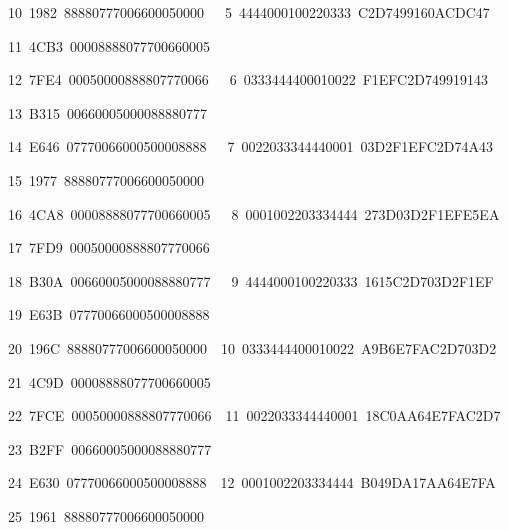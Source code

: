 \documentclass[a4paper,oneside,english]{amsart}
\numberwithin{equation}{section}
\numberwithin{figure}{section}
\newenvironment{lyxcode}
{\par\begin{list}{}{
\setlength{\rightmargin}{\leftmargin}
\setlength{\listparindent}{0pt}\raggedright
\setlength{\itemsep}{0pt}
\setlength{\parsep}{0pt}
\normalfont\ttfamily}\item[]}
{\end{list}}
\begin{document}
\begin{table}
\begin{lyxcode}
{\footnotesize{}~10~1982~88880777006600050000~~~5~4444000100220333~C2D7499160ACDC47}{\footnotesize \par}

{\footnotesize{}~11~4CB3~00008888077700660005}{\footnotesize \par}

{\footnotesize{}~12~7FE4~00050000888807770066~~~6~0333444400010022~F1EFC2D749919143}{\footnotesize \par}

{\footnotesize{}~13~B315~00660005000088880777}{\footnotesize \par}

{\footnotesize{}~14~E646~07770066000500008888~~~7~0022033344440001~03D2F1EFC2D74A43}{\footnotesize \par}

{\footnotesize{}~15~1977~88880777006600050000}{\footnotesize \par}

{\footnotesize{}~16~4CA8~00008888077700660005~~~8~0001002203334444~273D03D2F1EFE5EA}{\footnotesize \par}

{\footnotesize{}~17~7FD9~00050000888807770066}{\footnotesize \par}

{\footnotesize{}~18~B30A~00660005000088880777~~~9~4444000100220333~1615C2D703D2F1EF}{\footnotesize \par}

{\footnotesize{}~19~E63B~07770066000500008888}{\footnotesize \par}

{\footnotesize{}~20~196C~88880777006600050000~~10~0333444400010022~A9B6E7FAC2D703D2}{\footnotesize \par}

{\footnotesize{}~21~4C9D~00008888077700660005}{\footnotesize \par}

{\footnotesize{}~22~7FCE~00050000888807770066~~11~0022033344440001~18C0AA64E7FAC2D7}{\footnotesize \par}

{\footnotesize{}~23~B2FF~00660005000088880777}{\footnotesize \par}

{\footnotesize{}~24~E630~07770066000500008888~~12~0001002203334444~B049DA17AA64E7FA}{\footnotesize \par}

{\footnotesize{}~25~1961~88880777006600050000}{\footnotesize \par}


\end{lyxcode}
\end{table}
\end{document}
